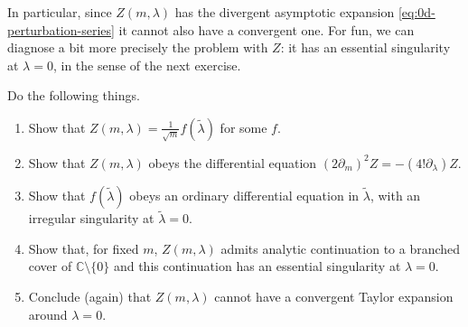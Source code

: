 \documentclass[12pt,letterpaper,reqno]{article}
\numberwithin{equation}{section}
\newcommand{\C}{\ensuremath{\mathbb C}}
\begin{document}
In particular, since $Z(m,\lambda)$ has the divergent asymptotic 
expansion \eqref{eq:0d-perturbation-series} it cannot also
have a convergent one.
For fun, we can diagnose a bit more precisely the problem with $Z$: it has an essential 
singularity at $\lambda = 0$, in the sense of the next exercise.
\begin{exercise} Do the following things.
\begin{enumerate}
\item Show that $Z(m,\lambda) = \frac{1}{\sqrt{m}} f(\tilde\lambda)$ for some $f$.
\item Show that $Z(m,\lambda)$ obeys the differential equation $(2\partial_m)^2 Z = -(4! \partial_\lambda) Z$.
\item Show that $f(\tilde\lambda)$ obeys an ordinary differential equation in $\tilde\lambda$,
with an irregular singularity at $\tilde\lambda = 0$.
\item Show that, for fixed $m$, $Z(m, \lambda)$ admits analytic continuation to a branched cover of $\C \setminus \{ 0 \}$
and this continuation has an essential singularity at $\lambda = 0$.
\item Conclude (again) that $Z(m, \lambda)$ cannot have
a convergent Taylor expansion around $\lambda = 0$.
\end{enumerate}
\end{exercise}
\end{document}
